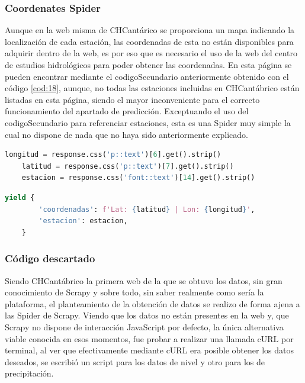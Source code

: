 \subsubsection{Coordenates Spider}
Aunque en la web misma de CHCantárico se proporciona un mapa indicando la localización de cada estación, las coordenadas de esta no están disponibles para adquirir dentro de la web, es por eso que es necesario el uso de la web del centro de estudios hidrológicos para poder obtener las coordenadas.\newline
\newline
En esta página se pueden encontrar mediante el codigoSecundario anteriormente obtenido con el código \ref{cod:18}, aunque, no todas las estaciones incluidas en CHCantábrico están listadas en esta página, siendo el mayor inconveniente para el correcto funcionamiento del apartado de predicción. Exceptuando el uso del codigoSecundario para referenciar estaciones, esta es una Spider muy simple la cual no dispone de nada que no haya sido anteriormente explicado.

\begin{lstlisting}[language=Python, caption={Selector en \textit{parse()} de CHCantábrico Coordinates Spider}]
	longitud = response.css('p::text')[6].get().strip()
	latitud = response.css('p::text')[7].get().strip()
	estacion = response.css('font::text')[14].get().strip()
\end{lstlisting}

\begin{lstlisting}[language=Python, caption={Guardado de datos de CHCantábrico Coordinates Spider}]
	yield {
		'coordenadas': f'Lat: {latitud} | Lon: {longitud}',
		'estacion': estacion,
	}
\end{lstlisting}

\subsubsection{Código descartado}
Siendo CHCantábrico la primera web de la que se obtuvo los datos, sin gran conocimiento de Scrapy y sobre todo, sin saber realmente como sería la plataforma, el planteamiento de la obtención de datos se realizo de forma ajena a las Spider de Scrapy.\newline
\newline
Viendo que los datos no están presentes en la web y, que Scrapy no dispone de interacción JavaScript por defecto, la única alternativa viable conocida en esos momentos, fue probar a realizar una llamada cURL por terminal, al ver que efectivamente mediante cURL era posible obtener los datos deseados, se escribió un script para los datos de nivel y otro para los de precipitación.

